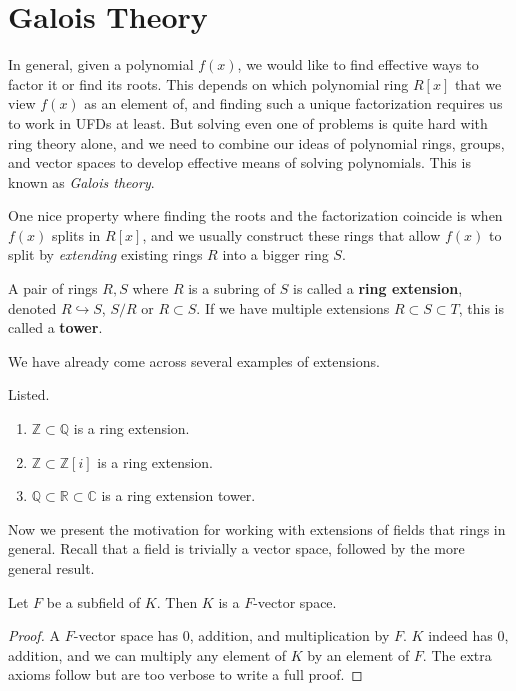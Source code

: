 \section{Galois Theory}

  In general, given a polynomial $f(x)$, we would like to find effective ways to factor it or find its roots. This depends on which polynomial ring $R[x]$ that we view $f(x)$ as an element of, and finding such a unique factorization requires us to work in UFDs at least. But solving even one of problems is quite hard with ring theory alone, and we need to combine our ideas of polynomial rings, groups, and vector spaces to develop effective means of solving polynomials. This is known as \textit{Galois theory}. 

  One nice property where finding the roots and the factorization coincide is when $f(x)$ splits in $R[x]$, and we usually construct these rings that allow $f(x)$ to split by \textit{extending} existing rings $R$ into a bigger ring $S$. 

  \begin{definition}
    A pair of rings $R, S$ where $R$ is a subring of $S$ is called a \textbf{ring extension}, denoted $R \hookrightarrow S$, $S/R$ or $R \subset S$. If we have multiple extensions $R \subset S \subset T$, this is called a \textbf{tower}. 
  \end{definition}

  We have already come across several examples of extensions. 

  \begin{example}
    Listed.
    \begin{enumerate}
      \item $\mathbb{Z} \subset \mathbb{Q}$ is a ring extension.
      \item $\mathbb{Z} \subset \mathbb{Z}[i]$ is a ring extension. 
      \item $\mathbb{Q} \subset \mathbb{R} \subset \mathbb{C}$ is a ring extension tower. 
    \end{enumerate}
  \end{example}

  Now we present the motivation for working with extensions of fields that rings in general. Recall that a field is trivially a vector space, followed by the more general result. 

  \begin{theorem}
    \label{thm:fields_vector_space}
    Let $F$ be a subfield of $K$. Then $K$ is a $F$-vector space. 
  \end{theorem}
  \begin{proof}
    A $F$-vector space has $0$, addition, and multiplication by $F$. $K$ indeed has $0$, addition, and we can multiply any element of $K$ by an element of $F$. The extra axioms follow but are too verbose to write a full proof. 
  \end{proof}

